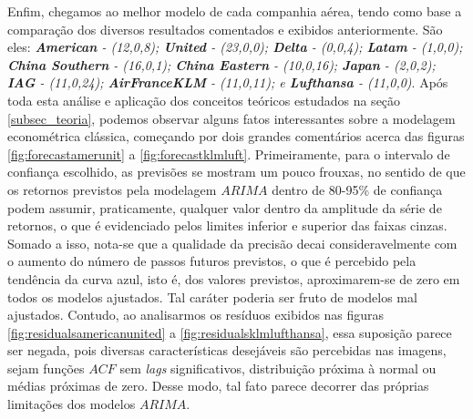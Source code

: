 \documentclass[12pt]{article}
\begin{document}
Enfim, chegamos ao melhor modelo de cada companhia aérea, tendo como base a comparação dos diversos resultados comentados e exibidos anteriormente. São eles: \emph{\textbf{American} - (12,0,8); \textbf{United} - (23,0,0); \textbf{Delta} - (0,0,4); \textbf{Latam} - (1,0,0); \textbf{China Southern} - (16,0,1); \textbf{China Eastern} - (10,0,16); \textbf{Japan} - (2,0,2); \textbf{IAG} - (11,0,24); \textbf{AirFranceKLM} - (11,0,11); e \textbf{Lufthansa} - (11,0,0)}. Após toda esta análise e aplicação dos conceitos teóricos estudados na seção \ref{subsec_teoria}, podemos observar alguns fatos interessantes sobre a modelagem econométrica clássica, começando por dois grandes comentários acerca das figuras \ref{fig:forecastamerunit} a \ref{fig:forecastklmluft}. Primeiramente, para o intervalo de confiança escolhido, as previsões se mostram um pouco frouxas, no sentido de que os retornos previstos pela modelagem $ARIMA$ dentro de 80-95\% de confiança podem assumir, praticamente, qualquer valor dentro da amplitude da série de retornos, o que é evidenciado pelos limites inferior e superior das faixas cinzas. Somado a isso, nota-se que a qualidade da precisão decai consideravelmente com o aumento do número de passos futuros previstos, o que é percebido pela tendência da curva azul, isto é, dos valores previstos, aproximarem-se de zero em todos os modelos ajustados. Tal caráter poderia ser fruto de modelos mal ajustados. Contudo, ao analisarmos os resíduos exibidos nas figuras \ref{fig:residualsamericanunited} a \ref{fig:residualsklmlufthansa}, essa suposição parece ser negada, pois diversas características desejáveis são percebidas nas imagens, sejam funções $ACF$ sem \textit{lags} significativos, distribuição próxima à normal ou médias próximas de zero. Desse modo, tal fato parece decorrer das próprias limitações dos modelos $ARIMA$.
\end{document}
